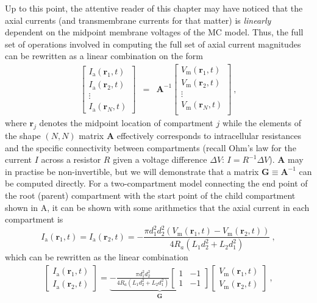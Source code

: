 Up to this point, the attentive reader of this chapter may have noticed that the axial currents (and transmembrane currents for that matter) is \textit{linearly} dependent on the midpoint membrane voltages of the MC model.
Thus, the full set of operations involved in computing the full set of axial current magnitudes can be rewritten as a linear combination on the form
%
\begin{eqnarray}
\begin{bmatrix}
I_\mathrm{a}(\mathbf{r}_1, t)\\
I_\mathrm{a}(\mathbf{r}_2, t)\\
\vdots \\
I_\mathrm{a}(\mathbf{r}_N, t)
\end{bmatrix}
&=& \mathbf{A}^{-1}
\begin{bmatrix}
V_\mathrm{m}(\mathbf{r}_1, t)\\
V_\mathrm{m}(\mathbf{r}_2, t)\\
\vdots \\
V_\mathrm{m}(\mathbf{r}_N, t)\\
\end{bmatrix} ~,
\label{eq:LFPy_linear_combination}
\end{eqnarray}
%
where $\mathbf{r}_j$ denotes the midpoint location of compartment $j$ while the elements of the shape $(N, N)$ matrix $\mathbf{A}$ effectively corresponds to intracellular resistances and the specific connectivity between compartments
(recall Ohm's law for the current $I$ across a resistor $R$ given a voltage difference $\Delta V$: $I=R^{-1} \Delta V$).
$\mathbf{A}$ may in practise be non-invertible,
but we will demonstrate that a matrix $\mathbf{G}\equiv \mathbf{A}^{-1}$ can be computed directly.
%
For a two-compartment model connecting the end point of the root (parent) compartment with the start point of the child compartment shown in A,
it can be shown with some arithmetics that the axial current in each compartment is 
%
\begin{equation}
I_\mathrm{a}(\mathbf{r}_1, t) = I_\mathrm{a}(\mathbf{r}_2, t) =
	- \frac{\pi d_{1}^{2} d_{2}^{2} \left(V_\mathrm{m}(\mathbf{r}_1, t) - V_\mathrm{m}(\mathbf{r}_2, t) \right)}{4 R_{a} \left(L_{1} d_{2}^{2} + L_{2} d_{1}^{2}\right)} ~,
\end{equation}
%
which can be rewritten as the linear combination
%
\begin{eqnarray}
\begin{bmatrix}
I_\mathrm{a}(\mathbf{r}_1, t)\\
I_\mathrm{a}(\mathbf{r}_2, t)
\end{bmatrix}
= \underbrace{
- \frac{\pi d_{1}^{2} d_{2}^{2}}{4 R_{a} \left(L_{1} d_{2}^{2} + L_{2} d_{1}^{2}\right)}
\begin{bmatrix}
1 & -1 \\
1 & -1
\end{bmatrix}
}_{\mathbf{G}}
\begin{bmatrix}
V_\mathrm{m}(\mathbf{r}_1, t) \\
V_\mathrm{m}(\mathbf{r}_2, t)
\end{bmatrix} ~,
\end{eqnarray}

